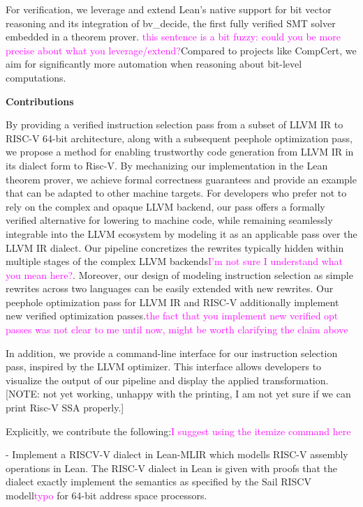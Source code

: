 For verification, we leverage and extend Lean’s native support for bit vector reasoning and its integration of bv\_decide, the first fully verified SMT solver embedded in a theorem prover. \textcolor{magenta}{this sentence is a bit fuzzy: could you be more precise about what you leverage/extend?}Compared to projects like CompCert, we aim for significantly more automation when reasoning about bit-level computations. 

\textbf{Contributions }

By providing a verified instruction selection pass from a subset of LLVM IR to RISC-V 64-bit architecture, along with a subsequent peephole optimization pass, we propose a method for enabling trustworthy code generation from LLVM IR in its dialect form to Risc-V. By mechanizing our implementation in the Lean theorem prover, we achieve formal correctness guarantees and provide an example that can be adapted to other machine targets. For developers who prefer not to rely on the complex and opaque LLVM backend, our pass offers a formally verified alternative for lowering to machine code, while remaining seamlessly integrable into the LLVM ecosystem by modeling it as an applicable pass over the LLVM IR dialect. Our pipeline concretizes the rewrites typically hidden within multiple stages of the complex LLVM backends\textcolor{magenta}{I'm not sure I understand what you mean here?}. Moreover, our design of modeling instruction selection as simple rewrites across two languages can be easily extended with new rewrites.
Our peephole optimization pass for LLVM IR and RISC-V additionally implement new verified optimization passes.\textcolor{magenta}{the fact that you implement new verified opt passes was not clear to me until now, might be worth clarifying the claim above}

In addition, we provide a command-line interface for our instruction selection pass, inspired by the LLVM optimizer. This interface allows developers to visualize the output of our pipeline and display the applied transformation.
[NOTE: not yet working, unhappy with the printing, I am not yet sure if we can print Risc-V SSA properly.]

Explicitly, we contribute the following:\textcolor{magenta}{I suggest using the itemize command here}

- Implement a RISCV-V dialect in Lean-MLIR which modells RISC-V assembly operations in Lean. The RISC-V dialect in Lean is given with proofs that the dialect exactly implement the semantics as specified by the Sail RISCV modell\textcolor{magenta}{typo} for 64-bit address space processors.

